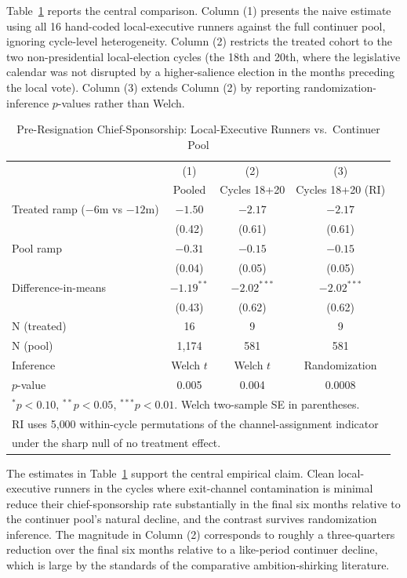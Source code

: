 \documentclass[11pt]{article}
\begin{document}
Table~\ref{tab:main} reports the central comparison. Column (1) presents the naive estimate using all 16 hand-coded local-executive runners against the full continuer pool, ignoring cycle-level heterogeneity. Column (2) restricts the treated cohort to the two non-presidential local-election cycles (the 18th and 20th, where the legislative calendar was not disrupted by a higher-salience election in the months preceding the local vote). Column (3) extends Column (2) by reporting randomization-inference $p$-values rather than Welch.

\begin{table}[H]
\centering
\caption{Pre-Resignation Chief-Sponsorship: Local-Executive Runners vs.\ Continuer Pool}
\label{tab:main}
\begin{tabular}{lccc}
\toprule
& (1) & (2) & (3) \\
& Pooled & Cycles 18+20 & Cycles 18+20 (RI) \\
\midrule
Treated ramp ($-6$m vs $-12$m) & $-1.50$ & $-2.17$ & $-2.17$ \\
& (0.42) & (0.61) & (0.61) \\
Pool ramp & $-0.31$ & $-0.15$ & $-0.15$ \\
& (0.04) & (0.05) & (0.05) \\
Difference-in-means & $-1.19^{**}$ & $-2.02^{***}$ & $-2.02^{***}$ \\
& (0.43) & (0.62) & (0.62) \\
\midrule
N (treated) & 16 & 9 & 9 \\
N (pool) & 1{,}174 & 581 & 581 \\
Inference & Welch $t$ & Welch $t$ & Randomization \\
$p$-value & 0.005 & 0.004 & 0.0008 \\
\bottomrule
\multicolumn{4}{l}{\footnotesize $^{*}p<0.10$, $^{**}p<0.05$, $^{***}p<0.01$. Welch two-sample SE in parentheses.} \\
\multicolumn{4}{l}{\footnotesize RI uses 5{,}000 within-cycle permutations of the channel-assignment indicator} \\
\multicolumn{4}{l}{\footnotesize under the sharp null of no treatment effect.} \\
\end{tabular}
\end{table}

The estimates in Table~\ref{tab:main} support the central empirical claim. Clean local-executive runners in the cycles where exit-channel contamination is minimal reduce their chief-sponsorship rate substantially in the final six months relative to the continuer pool's natural decline, and the contrast survives randomization inference. The magnitude in Column (2) corresponds to roughly a three-quarters reduction over the final six months relative to a like-period continuer decline, which is large by the standards of the comparative ambition-shirking literature.
\end{document}
